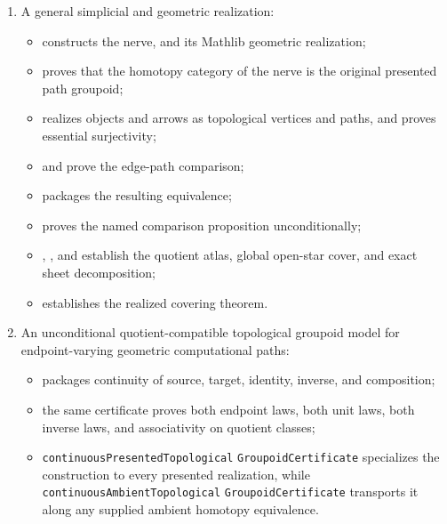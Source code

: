 \documentclass{lmcs}
\theoremstyle{definition}
\theoremstyle{plain}
\theoremstyle{remark}
\begin{document}
\begin{enumerate}
    \item A general simplicial and geometric realization:
    \begin{itemize}
        \item {} constructs the nerve, and
         its Mathlib
        geometric realization;
        \item {} proves that the homotopy
        category of the nerve is the original presented path groupoid;
        \item {}
        realizes objects and arrows as topological vertices and paths, and
         proves essential
        surjectivity;
        \item {} and
         prove the edge-path
        comparison;
        \item {} packages
        the resulting equivalence;
        \item {}
        proves the named comparison proposition unconditionally;
        \item {},
        , and
         establish
        the quotient atlas, global open-star cover, and exact sheet
        decomposition;
        \item {} establishes the realized
        covering theorem.
    \end{itemize}

    \item An unconditional quotient-compatible topological groupoid model for
    endpoint-varying geometric computational paths:
    \begin{itemize}
        \item {} packages
        continuity of source, target, identity, inverse, and composition;
        \item the same certificate proves both endpoint laws, both unit laws,
        both inverse laws, and associativity on quotient classes;
        \item \texttt{continuousPresentedTopological}\allowbreak
        \texttt{GroupoidCertificate}
        specializes the construction to every presented realization, while
        \texttt{continuousAmbientTopological}\allowbreak
        \texttt{GroupoidCertificate} transports it
        along any supplied ambient homotopy equivalence.
    \end{itemize}


\end{enumerate}
\end{document}
